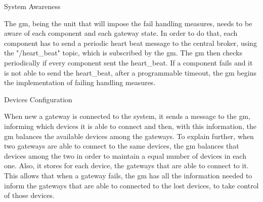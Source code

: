 \begin{Paragraph}{System Awareness}

The \ac{gm}, being the unit that will impose the fail handling measures, needs to be aware of each component and each gateway state. In order to do that, each component has to send a periodic heart beat message to the central broker, using the "/heart\_beat" topic, which is subscribed by the \ac{gm}. The \ac{gm} then checks periodically if every component sent the heart\_beat. If a component fails and it is not able to send the heart\_beat, after a programmable timeout, the \ac{gm} begins the implementation of failing handling measures.

\end{Paragraph}

\begin{Paragraph}{Devices Configuration}

When new a gateway is connected to the system, it sends a message to the \ac{gm}, informing which devices it is able to connect and then, with this information, the \ac{gm} balances the available devices among the gateways. To explain further, when two gateways are able to connect to the same devices, the \ac{gm} balances that devices among the two in order to maintain a equal number of devices in each one. Also, it stores for each device, the gateways that are able to connect to it. This allows that when a gateway fails, the \ac{gm} has all the information needed to inform the gateways that are able to connected to the lost devices, to take control of those devices.

\end{Paragraph}

